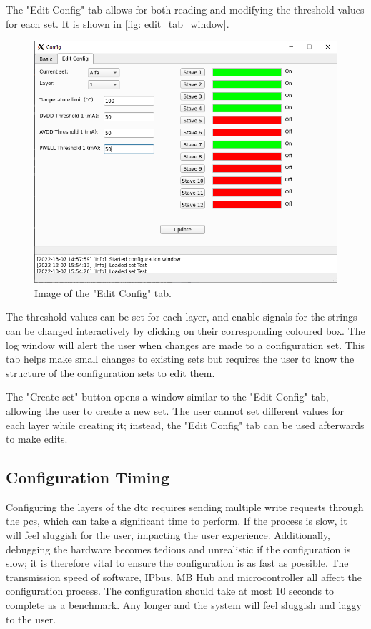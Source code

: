 \documentclass[main.tex]{subfiles}
\begin{document}
The "Edit Config" tab allows for both reading and modifying the threshold values for each set. It is shown in \autoref{fig: edit_tab_window}.

\begin{figure}[!ht]
    \centering
    \includegraphics[scale=0.55]{images/config_tab_gui.png}
    \caption{Image of the "Edit Config" tab.}
    \label{fig: edit_tab_window}
\end{figure}
\FloatBarrier

The threshold values can be set for each layer, and enable signals for the strings can be changed interactively by clicking on their corresponding coloured box. The log window will alert the user when changes are made to a configuration set. This tab helps make small changes to existing sets but requires the user to know the structure of the configuration sets to edit them.

The "Create set" button opens a window similar to the "Edit Config" tab, allowing the user to create a new set. The user cannot set different values for each layer while creating it; instead, the "Edit Config" tab can be used afterwards to make edits.


\subsection{Configuration Timing}
\label{ssec: con_timing}

Configuring the layers of the \gls{dtc} requires sending multiple write requests through the \gls{pcs}, which can take a significant time to perform. If the process is slow, it will feel sluggish for the user, impacting the user experience. Additionally, debugging the hardware becomes tedious and unrealistic if the configuration is slow; it is therefore vital to ensure the configuration is as fast as possible. The transmission speed of software, IPbus, MB Hub and microcontroller all affect the configuration process. The configuration should take at most 10 seconds to complete as a benchmark. Any longer and the system will feel sluggish and laggy to the user.
\end{document}

